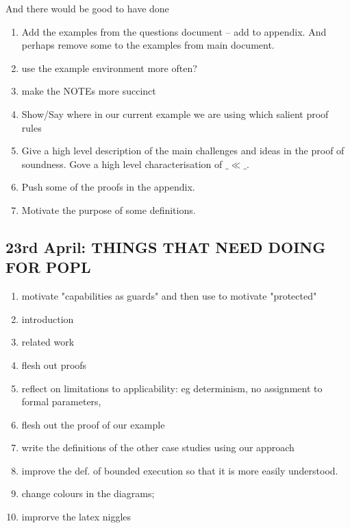 \documentclass[acmsmall,review,anonymous]{acmart}\settopmatter{printfolios=true}
\begin{document}
And there would be good to have done

\begin{enumerate}
\item
Add the examples from the questions document -- add to appendix. And perhaps remove some to the examples from main document.

\item
use the example environment more often?

\item
make the NOTEs more succinct

\item
Show/Say where in our current example we are using which salient proof rules

\item
Give a high level description of the main challenges and ideas in the proof of soundness. Gove a high level characterisation of $\_\ll\_$.

\item
Push some of the proofs in the appendix.

\item
Motivate the purpose of some definitions.

\end{enumerate}


\subsection*{23rd April: THINGS THAT NEED DOING FOR POPL}

\begin{enumerate}
\item
motivate "capabilities as guards" and then use to motivate "protected"
\item
introduction
\item
related work
\item
flesh out proofs
\item
reflect on limitations to applicability: eg determinism, no assignment to formal parameters, 
\item
flesh out the proof of our example
\item
write the definitions of the other case studies using our approach
\item
improve the def. of bounded execution so that it is more easily understood.
\item
change colours in the diagrams; 
\item
improrve the latex niggles 
\end{enumerate}

 
\end{document}
